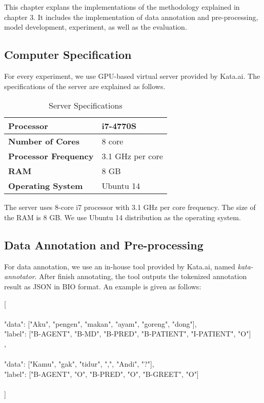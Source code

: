 \chapter{\babEmpat} \label{eksperimen}

This chapter explans the implementations of the methodology explained in chapter 3. It includes the implementation of data annotation and pre-processing, model development, experiment, as well as the evaluation.

\section{Computer Specification}
For every experiment, we use GPU-based virtual server provided by Kata.ai. The specifications of the server are explained as follows.

\begin{table}
	\centering
	\caption{Server Specifications}
	\begin{tabular}{|l|l|}
		\hline
		\textbf{Processor} & i7-4770S \\ \hline
		\textbf{Number of Cores} & 8 core \\ \hline
		\textbf{Processor Frequency} & 3.1 GHz per core \\ \hline
		\textbf{RAM} & 8 GB \\ \hline
		\textbf{Operating System} & Ubuntu 14 \\ \hline
	\end{tabular}
	\label{table:spesifikasi hardware}
\end{table}

The server uses 8-core i7 processor with 3.1 GHz per core frequency. The size of the RAM is 8 GB. We use Ubuntu 14 distribution as the operating system.

\section{Data Annotation and Pre-processing}
For data annotation, we use an in-house tool provided by Kata.ai, named \textit{kata-annotator}. After finish annotating, the tool outputs the tokenized annotation result as JSON in BIO format. An example is given as follows:

[\\
	{\\
		"data": ["Aku", "pengen", "makan", "ayam", "goreng", "dong"],\\
		"label": ["B-AGENT", "B-MD", "B-PRED", "B-PATIENT", "I-PATIENT", "O"]\\
	},\\
	{\\
		"data": ["Kamu", "gak", "tidur", ",", "Andi", "?"],\\
		"label": ["B-AGENT", "O", "B-PRED", "O", "B-GREET", "O"]\\
	}\\
]

